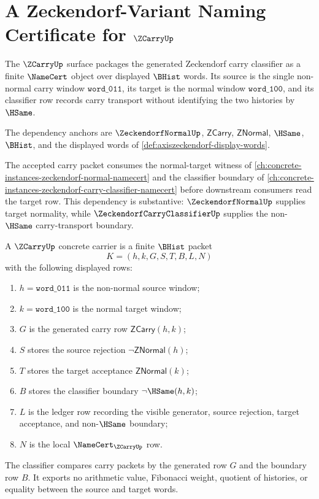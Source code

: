 \chapter{A Zeckendorf-Variant Naming Certificate for $\ZCarryUp$}
\label{ch:concrete-instances-zeckendorfcarry-namecert}

The $\ZCarryUp$ surface packages the generated Zeckendorf carry classifier as a finite $\NameCert$ object over displayed $\BHist$ words. Its source is the single non-normal carry window $\mathtt{word\_011}$, its target is the normal window $\mathtt{word\_100}$, and its classifier row records carry transport without identifying the two histories by $\HSame$.

The dependency anchors are $\ZeckendorfNormalUp$, $\mathsf{ZCarry}$, $\mathsf{ZNormal}$, $\HSame$, $\BHist$, and the displayed words of \autoref{def:axiszeckendorf-display-words}.

The accepted carry packet consumes the normal-target witness of \autoref{ch:concrete-instances-zeckendorf-normal-namecert} and the classifier boundary of \autoref{ch:concrete-instances-zeckendorf-carry-classifier-namecert} before downstream consumers read the target row. This dependency is substantive: $\ZeckendorfNormalUp$ supplies target normality, while $\ZeckendorfCarryClassifierUp$ supplies the non-$\HSame$ carry-transport boundary.

\begin{definition}
\label{def:zeckendorfcarry-concrete-carrier}
A $\ZCarryUp$ concrete carrier is a finite $\BHist$ packet
$$
K=(h,k,G,S,T,B,L,N)
$$
with the following displayed rows:
\begin{enumerate}
\item $h=\mathtt{word\_011}$ is the non-normal source window;
\item $k=\mathtt{word\_100}$ is the normal target window;
\item $G$ is the generated carry row $\mathsf{ZCarry}(h,k)$;
\item $S$ stores the source rejection $\neg\mathsf{ZNormal}(h)$;
\item $T$ stores the target acceptance $\mathsf{ZNormal}(k)$;
\item $B$ stores the classifier boundary $\neg\HSame(h,k)$;
\item $L$ is the ledger row recording the visible generator, source rejection, target acceptance, and non-$\HSame$ boundary;
\item $N$ is the local $\NameCert_{\ZCarryUp}$ row.
\end{enumerate}
The classifier compares carry packets by the generated row $G$ and the boundary row $B$. It exports no arithmetic value, Fibonacci weight, quotient of histories, or equality between the source and target words.
\end{definition}


